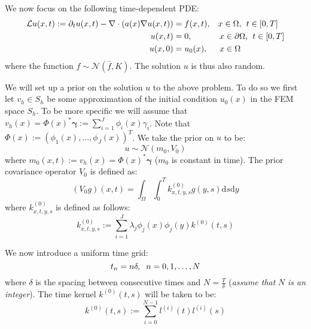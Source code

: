 \documentclass{article}
\theoremstyle{definition}
\theoremstyle{remark}
\theoremstyle{remark}
\begin{document}
\setlength\parskip{10pt}
\setlength\parindent{20pt}

\noindent We now focus on the following time-dependent PDE:
\begin{align}
        \mathcal{L}u(x,t) := \partial_{t}u(x,t) -\nabla\cdot(a(x)\nabla u(x,t))&=f(x,t), \hspace{0.3cm} x\in\Omega, \hspace{0.15cm} t\in[0,T] \\
        u(x,t) &= 0, \hspace{1.15cm} x\in\partial\Omega, \hspace{0.15cm} t\in[0,T] \\
        u(x,0) &= u_{0}(x), \hspace{0.5cm} x\in\Omega
\end{align}
where the function $f\sim\mathcal{N}(\bar{f},K)$. The solution $u$ is thus also random.

\noindent We will set up a prior on the solution $u$ to the above problem. To do so we first let $v_{h}\in S_{h}$ be some approximation of the initial condition $u_{0}(x)$ in the FEM space $S_{h}$. To be more specific we will assume that $v_{h}(x)=\Phi(x)^{*}\boldsymbol{\gamma}:=\sum_{i=1}^{J}\phi_{i}(x)\gamma_{i}$. Note that $\Phi(x):=(\phi_{1}(x),\dots,\phi_{J}(x))^{T}$. We take the prior on $u$ to be:
\begin{equation}
    u\sim\mathcal{N}(m_{0},V_{0})
\end{equation}
where $m_{0}(x,t):=v_{h}(x)=\Phi(x)^{*}\boldsymbol{\gamma}$ ($m_{0}$ is constant in time). The prior covariance operator $V_{0}$ is defined as:
\begin{equation}
    (V_{0}g)(x,t)=\int_{\Omega}\int_{0}^{T}k_{x,t,y,s}^{(0)}g(y,s)\mathrm{d}s\mathrm{d}y
\end{equation}
where $k_{x,t,y,s}^{(0)}$ is defined as follows:
\begin{equation}
    k_{x,t,y,s}^{(0)}:=\sum_{i=1}^{J}\lambda_{j}\phi_{j}(x)\phi_{j}(y)k^{(0)}(t,s)
\end{equation}

\noindent We now introduce a uniform time grid:
\begin{equation*}
    t_{n}=n\delta, \hspace{0.2cm} n=0,1,\dots,N
\end{equation*}
where $\delta$ is the spacing between consecutive times and $N=\frac{T}{\delta}$ (\textit{assume that} $N$ \textit{is an integer}). The time kernel $k^{(0)}(t,s)$ will be taken to be:
\begin{equation}
  \label{time_kernel_0}
  k^{(0)}(t,s) := \sum_{i=0}^{N-1}l^{(i)}(t)l^{(i)}(s)
\end{equation}
\end{document}
